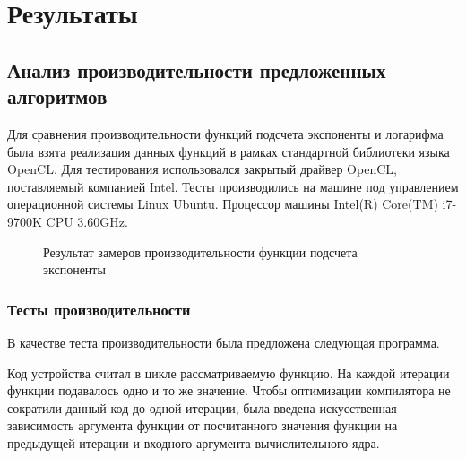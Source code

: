 \chapter{Результаты}

\section{Анализ производительности предложенных алгоритмов}

Для сравнения производительности функций подсчета экспоненты и логарифма была взята реализация данных функций в рамках стандартной библиотеки языка OpenCL.
Для тестирования использовался закрытый драйвер OpenCL, поставляемый компанией Intel.
Тесты производились на машине под управлением операционной системы Linux Ubuntu.
Процессор машины Intel(R) Core(TM) i7-9700K CPU 3.60GHz.

\begin{figure}[h]
  \centering
  \caption{Результат замеров производительности функции подсчета экспоненты}
  \label{hist:exp:perf}
\end{figure}

\subsection{Тесты производительности}

В качестве теста производительности была предложена следующая программа.

Код устройства считал в цикле рассматриваемую функцию.
На каждой итерации функции подавалось одно и то же значение.
Чтобы оптимизации компилятора не сократили данный код до одной итерации, была введена искусственная зависимость аргумента функции от посчитанного значения функции на предыдущей итерации и входного аргумента вычислительного ядра.

